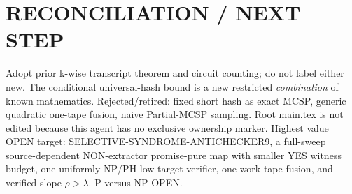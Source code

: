 \documentclass[11pt]{article}
\begin{document}
\section*{RECONCILIATION / NEXT STEP}
Adopt prior k-wise transcript theorem and circuit counting; do not label either new. The conditional universal-hash bound is a new restricted \emph{combination} of known mathematics. Rejected/retired: fixed short hash as exact MCSP, generic quadratic one-tape fusion, naive Partial-MCSP sampling. Root main.tex is not edited because this agent has no exclusive ownership marker. Highest value OPEN target: SELECTIVE-SYNDROME-ANTICHECKER9, a full-sweep source-dependent NON-extractor promise-pure map with smaller YES witness budget, one uniformly NP/PH-low target verifier, one-work-tape fusion, and verified slope $\rho>\lambda$. P versus NP OPEN.
\end{document}
